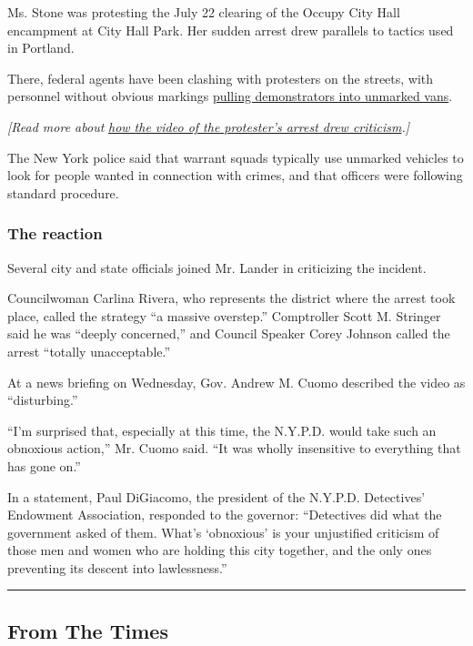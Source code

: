 Ms. Stone was protesting the July 22 clearing of the Occupy City Hall
encampment at City Hall Park. Her sudden arrest drew parallels to
tactics used in Portland.

There, federal agents have been clashing with protesters on the streets,
with personnel without obvious markings
\href{https://www.nytimes3xbfgragh.onion/2020/07/17/us/portland-protests.html}{pulling
demonstrators into unmarked vans}.

\emph{{[}Read more about}
\href{https://www.nytimes3xbfgragh.onion/2020/07/28/nyregion/nypd-protester-van.html}{\emph{how
the video of the protester's arrest drew criticism}}\emph{.{]}}

The New York police said that warrant squads typically use unmarked
vehicles to look for people wanted in connection with crimes, and that
officers were following standard procedure.

\hypertarget{the-reaction}{%
\subsubsection{The reaction}\label{the-reaction}}

Several city and state officials joined Mr. Lander in criticizing the
incident.

Councilwoman Carlina Rivera, who represents the district where the
arrest took place, called the strategy ``a massive overstep.''
Comptroller Scott M. Stringer said he was ``deeply concerned,'' and
Council Speaker Corey Johnson called the arrest ``totally
unacceptable.''

At a news briefing on Wednesday, Gov. Andrew M. Cuomo described the
video as ``disturbing.''

``I'm surprised that, especially at this time, the N.Y.P.D. would take
such an obnoxious action,'' Mr. Cuomo said. ``It was wholly insensitive
to everything that has gone on.''

In a statement, Paul DiGiacomo, the president of the N.Y.P.D.
Detectives' Endowment Association, responded to the governor:
``Detectives did what the government asked of them. What's `obnoxious'
is your unjustified criticism of those men and women who are holding
this city together, and the only ones preventing its descent into
lawlessness.''

\begin{center}\rule{0.5\linewidth}{\linethickness}\end{center}

\hypertarget{from-the-times}{%
\subsection{From The Times}\label{from-the-times}}


